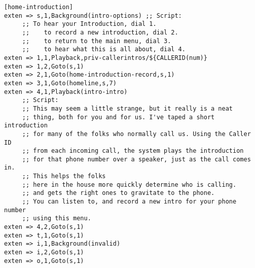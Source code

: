 \begin{astlisting}
\begin{verbatim}
[home-introduction]
exten => s,1,Background(intro-options) ;; Script:
     ;; To hear your Introduction, dial 1.
     ;;    to record a new introduction, dial 2.
     ;;    to return to the main menu, dial 3.
     ;;    to hear what this is all about, dial 4.
exten => 1,1,Playback,priv-callerintros/${CALLERID(num)}
exten => 1,2,Goto(s,1)
exten => 2,1,Goto(home-introduction-record,s,1)
exten => 3,1,Goto(homeline,s,7)
exten => 4,1,Playback(intro-intro)
     ;; Script:
     ;; This may seem a little strange, but it really is a neat
     ;; thing, both for you and for us. I've taped a short introduction
     ;; for many of the folks who normally call us. Using the Caller ID
     ;; from each incoming call, the system plays the introduction
     ;; for that phone number over a speaker, just as the call comes in.
     ;; This helps the folks
     ;; here in the house more quickly determine who is calling.
     ;; and gets the right ones to gravitate to the phone.
     ;; You can listen to, and record a new intro for your phone number
     ;; using this menu.
exten => 4,2,Goto(s,1)
exten => t,1,Goto(s,1)
exten => i,1,Background(invalid)
exten => i,2,Goto(s,1)
exten => o,1,Goto(s,1)


\end{verbatim}
\end{astlisting}
